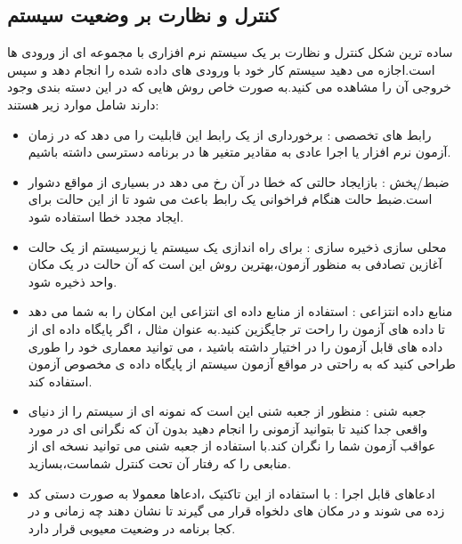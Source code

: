 \subsection{کنترل و نظارت بر وضعیت سیستم}
ساده ترین شکل کنترل و نظارت بر یک سیستم نرم افزاری با مجموعه ای از ورودی ها است.اجازه می دهید سیستم کار خود با ورودی های داده شده را انجام دهد و سپس خروجی آن را مشاهده می کنید.به صورت خاص روش هایی که در این دسته بندی وجود دارند شامل موارد زیر هستند:
\begin{itemize}
\item
رابط های تخصصی :
برخورداری از یک رابط این قابلیت را می دهد که در زمان آزمون نرم افزار یا اجرا عادی به مقادیر متغیر ها در برنامه دسترسی داشته باشیم. 
\item
ضبط/پخش  :
بازایجاد حالتی که خطا در آن رخ می دهد در بسیاری از مواقع دشوار است.ضبط حالت هنگام فراخوانی یک رابط باعث می شود تا از این حالت برای ایجاد مجدد خطا استفاده شود.
\item
محلی سازی ذخیره سازی  :
برای راه اندازی یک سیستم یا زیرسیستم از یک حالت آغازین تصادفی به منظور آزمون،‌بهترین روش این است که آن حالت در یک مکان واحد ذخیره شود.
\item
منابع داده انتزاعی  :
استفاده از منابع داده ای انتزاعی این امکان را به شما می دهد تا داده های آزمون را راحت تر جایگزین کنید.به عنوان مثال ، اگر پایگاه داده ای از داده های قابل آزمون را در اختیار داشته باشید ، می توانید معماری خود را طوری طراحی کنید که به راحتی در مواقع آزمون سیستم از پایگاه داده ی مخصوص آزمون استفاده کند.
\item
جعبه شنی  :
منظور از جعبه شنی این است که نمونه ای از سیستم را از دنیای واقعی جدا کنید تا بتوانید آزمونی را انجام دهید بدون آن که نگرانی ای در مورد عواقب آزمون شما را نگران کند.با استفاده از جعبه شنی می توانید نسخه ای از منابعی را که رفتار آن تحت کنترل شماست،‌بسازید.
\item
ادعاهای قابل اجرا  :
با استفاده از این تاکتیک ،‌ادعاها معمولا به صورت دستی کد زده می شوند و در مکان های دلخواه قرار می گیرند تا نشان دهند چه زمانی و در کجا برنامه در وضعیت معیوبی قرار دارد.
\end{itemize}
